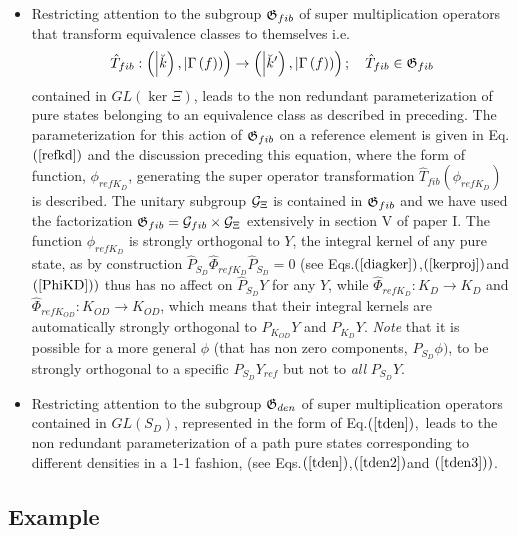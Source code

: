 \begin{itemize}
\item Restricting attention to the subgroup ${\frak G}_{fib}$ of super
multiplication operators that transform equivalence classes to themselves
i.e. 
\begin{equation}
\hat{T}_{fib}:\left( \left| \breve{k}\right) ,\left| \Gamma \left( f\right)
\right) \right) \rightarrow \left( \left| \breve{k}^{\prime }\right) ,\left|
\Gamma \left( f\right) \right) \right) ;\quad \hat{T}_{fib}\in {\frak G}%
_{fib}
\end{equation}%
contained in $GL\left( \ker \Xi \right) $, leads to the non redundant
parameterization of pure states belonging to an equivalence class as
described in preceding. The parameterization for this action of ${\frak G}%
_{fib}$ on a reference element is given in Eq.$\left( \ref{refkd}\right) $
and the discussion preceding this equation, where the form of function, $%
\phi _{refK_{D}}$, generating the super operator transformation $\hat{T}%
_{fib}\left( \phi _{refK_{D}}\right) $ is described. The unitary subgroup $%
{\cal G}_{\Xi }$ is contained in ${\frak G}_{fib}$ and we have used the
factorization ${\frak G}_{fib}={\cal G}_{fib}\times {\cal G}_{\Xi }$
extensively in section V of paper I. The function $\phi _{refK_{D}}$ is
strongly orthogonal to $Y$, the integral kernel of any pure state, as by
construction $\hat{P}_{S_{D}}\hat{\Phi}_{refK_{D}}\hat{P}_{S_{D}}=0$ (see
Eqs.$\left( \ref{diagker}\right) $,$\left( \ref{kerproj}\right) $and $\left( %
\ref{PhiKD}\right) )$ thus has no affect on $\hat{P}_{S_{D}}Y$ for any $Y$,
while $\hat{\Phi}_{refK_{D}}:K_{D}\rightarrow K_{D}$ and $\hat{\Phi}%
_{refK_{OD}}:K_{OD}\rightarrow K_{OD}$, which means that their integral
kernels are automatically strongly orthogonal to $P_{K_{OD}}Y$ and $%
P_{K_{D}}Y$. {\it Note }that it is possible for a more general $\phi $ (that
has non zero components, $P_{S_{D}}\phi )$, to be strongly orthogonal to a
specific $P_{S_{D}}Y_{ref}$ but not to {\it all }$P_{S_{D}}Y$.

\item Restricting attention to the subgroup ${\frak G}_{den}$ of super
multiplication operators contained in $GL\left( S_{D}\right) $, represented
in the form of Eq.$\left( \ref{tden}\right) $,\ leads to the non redundant
parameterization of a path pure states corresponding to different densities
in a 1-1 fashion, (see Eqs.$\left( \ref{tden}\right) $,$\left( \ref{tden2}%
\right) $and $\left( \ref{tden3}\right) )$.
\end{itemize}

\subsection{Example\protect\bigskip}

